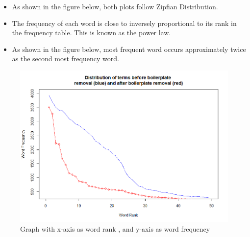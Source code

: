 \begin{itemize}
\item As shown in the figure below, both plots follow Zipfian Distribution\cite{Zipf}.
\item The frequency of each word is close to inversely proportional to its rank in the frequency table. This is known as the power law.
\item As shown in the figure below, most frequent word occurs approximately twice as the second most frequency word.
\end{itemize}	        
\begin{figure}[ht]
	\begin{center}
		\includegraphics[scale=0.40]{Rplotfinal.png}
		\caption{Graph with x-axis as word rank , and y-axis as word frequency}
		\end{center}
\end{figure}